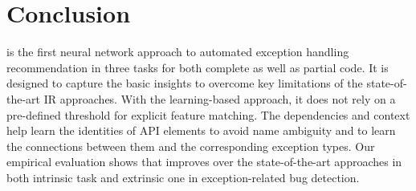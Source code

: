 \section{Conclusion}

{\tool} is the first neural network approach to automated exception
handling recommendation in three tasks for both complete as well as
partial code. It is designed to capture the basic insights to overcome
key limitations of the state-of-the-art IR approaches. With the
learning-based approach, it does not rely on a pre-defined threshold
for explicit feature matching. The dependencies and context help
{\tool} learn the identities of API elements to avoid name ambiguity
and to learn the connections between them and the corresponding
exception types. Our empirical evaluation shows that {\tool} improves
over the state-of-the-art approaches in both intrinsic task and
extrinsic one in exception-related bug detection.
